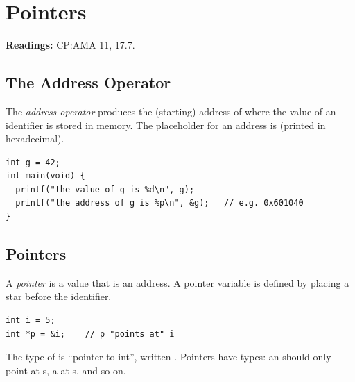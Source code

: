 \chapter{Pointers}

\textbf{Readings:} CP:AMA 11, 17.7.


\section{The Address Operator}

The \emph{address operator} \code{\&} produces the (starting) address of where the value of an
identifier is stored in memory. The  placeholder for an address is 
(printed in hexadecimal).
\begin{lstlisting}[style=c]
int g = 42;
int main(void) {
  printf("the value of g is %d\n", g);
  printf("the address of g is %p\n", &g);   // e.g. 0x601040
}
\end{lstlisting}

\section{Pointers}

\begin{definition}
A \emph{pointer} is a value that is an address. A pointer variable is defined by placing a star
\code{*} before the identifier.
\end{definition}

\begin{lstlisting}[style=c]
int i = 5;
int *p = &i;    // p "points at" i
\end{lstlisting}

\begin{center}
\end{center}

The type of  is ``pointer to int'', written . Pointers have types:
an  should only point at s, a  at s, and so on.

